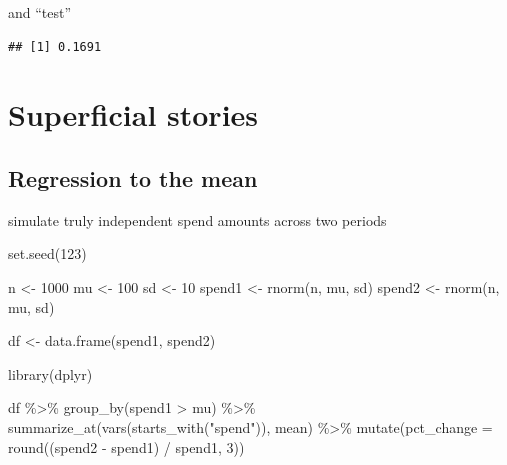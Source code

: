 \documentclass[
]{krantz}
\makeatletter
\newenvironment{Shaded}{\begin{snugshade}}{\end{snugshade}}
\newcommand{\AttributeTok}[1]{\textcolor[rgb]{0.61,0.61,0.61}{#1}}
\newcommand{\DecValTok}[1]{\textcolor[rgb]{0.06,0.06,0.06}{#1}}
\newcommand{\FunctionTok}[1]{\textcolor[rgb]{0,0,0}{#1}}
\newcommand{\NormalTok}[1]{#1}
\newcommand{\OtherTok}[1]{\textcolor[rgb]{0.37,0.37,0.37}{#1}}
\newcommand{\SpecialCharTok}[1]{\textcolor[rgb]{0,0,0}{#1}}
\newcommand{\StringTok}[1]{\textcolor[rgb]{0.5,0.5,0.5}{#1}}
\newenvironment{kframe}{%
\medskip{}
\setlength{\fboxsep}{.8em}
 \def\at@end@of@kframe{}%
 \ifinner\ifhmode%
  \def\at@end@of@kframe{\end{minipage}}%
  \begin{minipage}{\columnwidth}%
 \fi\fi%
 \def\FrameCommand##1{\hskip\@totalleftmargin \hskip-\fboxsep
 \colorbox{shadecolor}{##1}\hskip-\fboxsep
     \hskip-\linewidth \hskip-\@totalleftmargin \hskip\columnwidth}%
 \MakeFramed {\advance\hsize-\width
   \@totalleftmargin\z@ \linewidth\hsize
   \@setminipage}}%
 {\par\unskip\endMakeFramed%
 \at@end@of@kframe}
\renewenvironment{Shaded}{\begin{kframe}}{\end{kframe}}
\makeatother
\begin{document}
and ``test''

\begin{Shaded}
\end{Shaded}

\begin{verbatim}
## [1] 0.1691
\end{verbatim}

\hypertarget{superficial-stories}{%
\section{Superficial stories}\label{superficial-stories}}

\hypertarget{regression-to-the-mean}{%
\subsection{Regression to the mean}\label{regression-to-the-mean}}

simulate truly independent spend amounts across two periods

\begin{Shaded}
\begin{Highlighting}[]
\FunctionTok{set.seed}\NormalTok{(}\DecValTok{123}\NormalTok{)}

\NormalTok{n  }\OtherTok{\textless{}{-}} \DecValTok{1000}
\NormalTok{mu }\OtherTok{\textless{}{-}} \DecValTok{100}
\NormalTok{sd }\OtherTok{\textless{}{-}} \DecValTok{10}
\NormalTok{spend1 }\OtherTok{\textless{}{-}} \FunctionTok{rnorm}\NormalTok{(n, mu, sd)}
\NormalTok{spend2 }\OtherTok{\textless{}{-}} \FunctionTok{rnorm}\NormalTok{(n, mu, sd)}

\NormalTok{df }\OtherTok{\textless{}{-}} \FunctionTok{data.frame}\NormalTok{(spend1, spend2)}
\end{Highlighting}
\end{Shaded}

\begin{Shaded}
\begin{Highlighting}[]
\FunctionTok{library}\NormalTok{(dplyr)}

\NormalTok{df }\SpecialCharTok{\%\textgreater{}\%} 
  \FunctionTok{group\_by}\NormalTok{(spend1 }\SpecialCharTok{\textgreater{}}\NormalTok{ mu) }\SpecialCharTok{\%\textgreater{}\%}
  \FunctionTok{summarize\_at}\NormalTok{(}\FunctionTok{vars}\NormalTok{(}\FunctionTok{starts\_with}\NormalTok{(}\StringTok{"spend"}\NormalTok{)), mean) }\SpecialCharTok{\%\textgreater{}\%}
  \FunctionTok{mutate}\NormalTok{(}\AttributeTok{pct\_change =} \FunctionTok{round}\NormalTok{((spend2 }\SpecialCharTok{{-}}\NormalTok{ spend1) }\SpecialCharTok{/}\NormalTok{ spend1, }\DecValTok{3}\NormalTok{))}
\end{Highlighting}
\end{Shaded}
\end{document}
